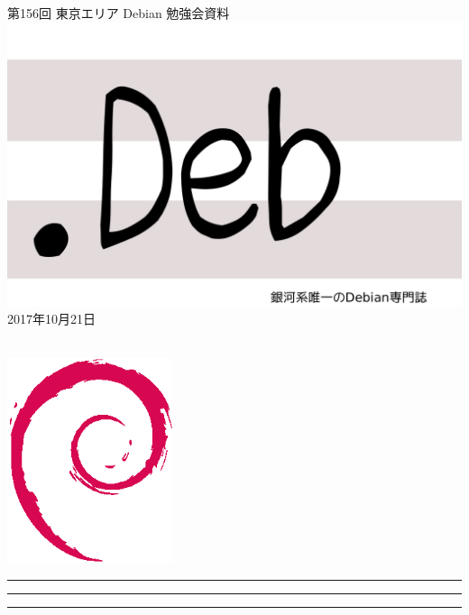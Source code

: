 \documentclass[mingoth,a4paper]{jsarticle}
\newcommand{\debmtgyear}{2017}
\newcommand{\debmtgmonth}{10}
\newcommand{\debmtgdate}{21}
\newcommand{\debmtgnumber}{156}
\begin{document}
\begin{titlepage}
\thispagestyle{empty}

\vspace*{-2cm}
第\debmtgnumber{}回 東京エリア Debian 勉強会資料\\
\hspace*{-2cm}
\includegraphics{image2012-natsu/dotdeb.pdf}\\
\hfill{}\debmtgyear{}年\debmtgmonth{}月\debmtgdate{}日

\\

\vspace*{-2cm}
\hfill{}\includegraphics[height=6cm]{image200502/openlogo-nd.eps}
\end{titlepage}

\newpage

\begin{minipage}[b]{0.2\hsize}
 \colorbox{titleback}{}
\end{minipage}
\begin{minipage}[b]{0.8\hsize}
\hrule
\vspace{2mm}
\hrule
\begin{multicols}{2}
\tableofcontents
\end{multicols}
\vspace{2mm}
\hrule
\end{minipage}
\end{document}
